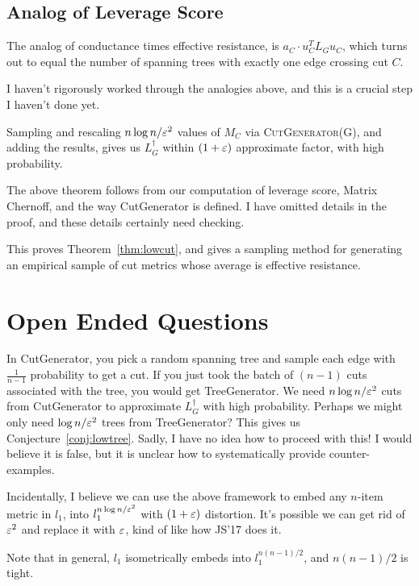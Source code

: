 \subsection{Analog of Leverage Score}
The analog of conductance times effective resistance, is $a_C \cdot
u_C^T L_G u_C$, which turns out to equal the number of spanning trees
with exactly one edge crossing cut $C$.

I haven't rigorously worked through the analogies above, and this is a
crucial step I haven't done yet.

\begin{theorem} Sampling and rescaling $n \log n / \varepsilon^2$
  values of $M_C$ via \textsc{CutGenerator(G)}, and adding the results,
  gives us $L_G^\dag$ within $(1+\varepsilon)$ approximate factor, with high
  probability.
\end{theorem}
The above theorem follows from our computation of leverage score,
Matrix Chernoff, and
the way CutGenerator is defined. I have omitted details in the
proof, and these details certainly need checking. 

This proves Theorem~\ref{thm:lowcut}, and gives a sampling method for
generating an empirical sample of cut metrics whose average is effective
resistance.

\section{Open Ended Questions}
In CutGenerator, you pick a random spanning tree and sample
each edge with $\frac{1}{n-1}$ probability to get a cut. If you just
took the batch of $(n-1)$ cuts associated with the tree, you would get
TreeGenerator. We need $ n \log n / \varepsilon^2$ cuts from CutGenerator to
approximate $L_G^\dag$ with high probability.
Perhaps we might only need $\log n / \varepsilon^2$ trees from TreeGenerator?
This gives us Conjecture~\ref{conj:lowtree}.  
Sadly, I have no idea how to proceed with this! I would believe it is
false, but it is unclear how to systematically provide counter-examples.

Incidentally, I believe we can use the above framework to
embed any $n$-item metric in $l_1$, into $l_1^{n \log n / \varepsilon^2}$
with $(1+\varepsilon)$ distortion. It's possible we can get rid of $\varepsilon^2$ and
replace it with $\varepsilon$, kind of like how JS'17 does it.

Note that in general, $l_1$ isometrically embeds into $l_1^{n(n-1)/2}$,
and $n(n-1)/2$ is tight.

